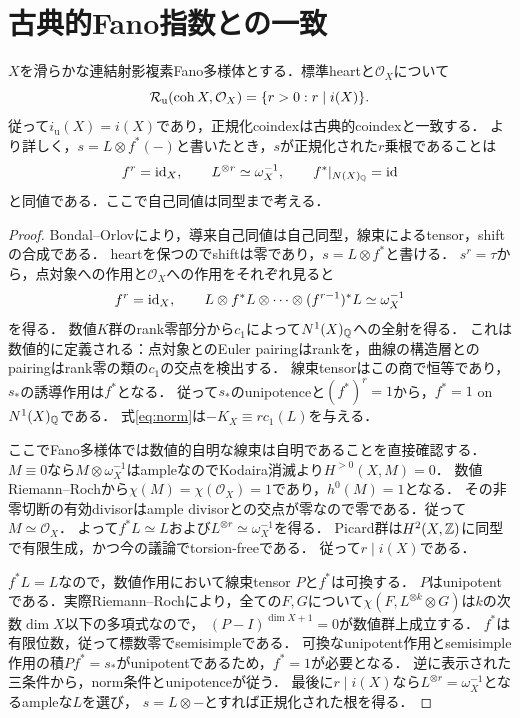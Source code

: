 \documentclass[11pt,a4paper]{ltjsarticle}
\newcommand{\Runi}{\mathcal R_{\mathrm u}}
\begin{document}
\section{古典的Fano指数との一致}
\begin{theorem}\label{thm:classical}
$X$を滑らかな連結射影複素Fano多様体とする．標準heartと$\mathcal O_X$について
\[
 \Runi(\coh X,\mathcal O_X)=\{r>0:r\mid i(X)\}.
\]
従って$i_{\mathrm u}(X)=i(X)$であり，正規化coindexは古典的coindexと一致する．
より詳しく，$s=L\otimes f^*(-)$と書いたとき，$s$が正規化された$r$乗根であることは
\[
 f^r=\operatorname{id}_X,\qquad L^{\otimes r}\simeq\omega_X^{-1},\qquad
 f^*|_{N(X)_{\mathbb Q}}=\operatorname{id}
\]
と同値である．ここで自己同値は同型まで考える．
\end{theorem}
\begin{proof}
Bondal--Orlov\cite[Theorem 3.1]{BO}により，導来自己同値は自己同型，線束によるtensor，shiftの合成である．
heartを保つのでshiftは零であり，$s=L\otimes f^*$と書ける．
$s^r=\tau$から，点対象への作用と$\mathcal O_X$への作用をそれぞれ見ると
\begin{equation}\label{eq:norm}
 f^r=\operatorname{id}_X,\qquad
 L\otimes f^*L\otimes\cdots\otimes(f^{r-1})^*L\simeq\omega_X^{-1}
\end{equation}
を得る．
数値$K$群のrank零部分から$c_1$によって$N^1(X)_{\mathbb Q}$への全射を得る．
これは数値的に定義される：点対象とのEuler pairingはrankを，曲線の構造層とのpairingはrank零の類の$c_1$の交点を検出する．
線束tensorはこの商で恒等であり，$s_*$の誘導作用は$f^*$となる．
従って$s_*$のunipotenceと$(f^*)^r=1$から，$f^*=1$ on $N^1(X)_{\mathbb Q}$である．
式\eqref{eq:norm}は$-K_X\equiv r c_1(L)$を与える．

ここでFano多様体では数値的自明な線束は自明であることを直接確認する．
$M\equiv0$なら$M\otimes\omega_X^{-1}$はampleなのでKodaira消滅より$H^{>0}(X,M)=0$．
数値Riemann--Rochから$\chi(M)=\chi(\mathcal O_X)=1$であり，$h^0(M)=1$となる．
その非零切断の有効divisorはample divisorとの交点が零なので零である．従って$M\simeq\mathcal O_X$．
よって$f^*L\simeq L$および$L^{\otimes r}\simeq\omega_X^{-1}$を得る．
Picard群は$H^2(X,\mathbb Z)$に同型で有限生成，かつ今の議論でtorsion-freeである．
従って$r\mid i(X)$である．

$f^*L=L$なので，数値作用において線束tensor $P$と$f^*$は可換する．
$P$はunipotentである．実際Riemann--Rochにより，全ての$F,G$について$\chi(F,L^{\otimes k}\otimes G)$は$k$の次数$\dim X$以下の多項式なので，
$(P-I)^{\dim X+1}=0$が数値群上成立する．
$f^*$は有限位数，従って標数零でsemisimpleである．
可換なunipotent作用とsemisimple作用の積$P f^*=s_*$がunipotentであるため，$f^*=1$が必要となる．
逆に表示された三条件から，norm条件とunipotenceが従う．
最後に$r\mid i(X)$なら$L^{\otimes r}=\omega_X^{-1}$となるampleな$L$を選び，
$s=L\otimes-$とすれば正規化された根を得る．
\end{proof}
\end{document}
